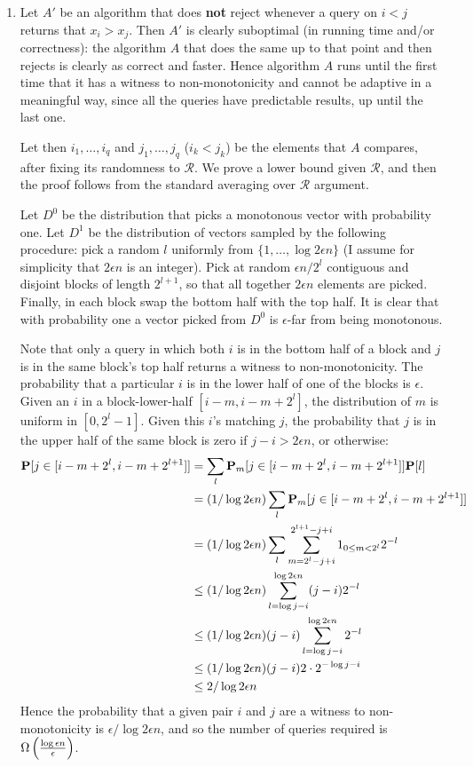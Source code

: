 \documentclass[11pt]{article} \usepackage{amssymb}
\begin{document}
\begin{enumerate}
\item
Let $A'$ be an algorithm that does {\bf not} reject whenever a query on
$i < j$ returns that $x_i > x_j$. Then $A'$ is clearly suboptimal (in running
time and/or correctness): the algorithm $A$ that does the same up to that point
and then rejects is clearly as correct and faster. Hence algorithm $A$ 
runs until the first time that it has a witness to non-monotonicity and cannot
be adaptive in a meaningful way, since all the queries have predictable 
results, up until the last one.

Let then $i_1,\ldots,i_q$ and $j_1,\ldots,j_q$  ($i_k<j_k$) be the elements that $A$
compares, after fixing its randomness to $\mathcal{R}$. We prove a lower bound given 
$\mathcal{R}$, and then the proof follows from the standard averaging over 
$\mathcal{R}$ argument.

Let $D^0$ be the distribution that picks a monotonous vector with probability
one. Let $D^1$ be the distribution of vectors sampled by the following 
procedure: pick a random $l$ uniformly from 
$\{1,\ldots,\log 2\epsilon n \}$ 
(I assume for simplicity that $2\epsilon n$ is an integer).
Pick at random $\epsilon n/2^l$ contiguous and disjoint blocks of length 
$2^{l+1}$, so that all together $2\epsilon n$ elements are picked. Finally, in
each block swap the bottom half with the top half. It is clear that with
probability one a vector picked from $D^0$ is $\epsilon$-far from being
monotonous. 

Note that only a query in which both $i$ is in the bottom half of a block 
and $j$ is in the same block's top half returns a witness to non-monotonicity.
The probability that a particular $i$ is in the lower half of one of the blocks
is $\epsilon$. Given an $i$ in a block-lower-half $[i-m,i-m+2^l]$, the 
distribution of $m$ is uniform in $[0,2^l-1]$. 
Given this $i$'s matching $j$, the probability that
$j$ is in the upper half of the same block is zero if $j-i>2\epsilon n$, or 
otherwise:
\begin{align*}
  \P[j\in [i-m+2^l,i-m+2^{l+1}]] &= \sum_l \P_m[j\in [i-m+2^l,i-m+2^{l+1}]]\P[l]
\\ &= (1/\log 2\epsilon n)\sum_l \P_m[j\in [i-m+2^l,i-m+2^{l+1}]]
\\ &= (1/\log 2\epsilon n)\sum_l \sum_{m=2^l-j+i}^{2^{l+1}-j+i}1_{0\leq m < 2^l}2^{-l}
\\ &\leq (1/\log 2\epsilon n)\sum_{l=\log j-i}^{\log2\epsilon n} (j-i)2^{-l}
\\ &\leq (1/\log 2\epsilon n)(j-i)\sum_{l=\log j-i}^{\log2\epsilon n}2^{-l}
\\ &\leq (1/\log 2\epsilon n)(j-i)2\cdot2^{-\log j-i}
\\ &\leq 2/\log 2\epsilon n
\end{align*}
Hence the probability that a given pair $i$ and $j$ are a witness to 
non-monotonicity is $\epsilon/\log 2\epsilon n$, and so the number of queries required is
$\Omega \left({\log \epsilon n\over \epsilon}\right)$.

\end{enumerate}
\end{document}
